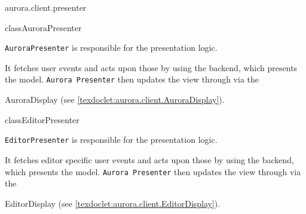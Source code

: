 \begin{texdocpackage}{aurora.client.presenter}
\label{texdoclet:aurora.client.presenter}

\begin{texdocclass}{class}{AuroraPresenter}{}{}
\label{texdoclet:aurora.client.presenter.AuroraPresenter}
\begin{texdocclassintro}
\begin{texdocp}
     \texttt{AuroraPresenter} is responsible for the presentation logic.
 \end{texdocp}\texdocbr  \begin{texdocp}
     It fetches user events and acts upon those by using the backend, which presents the model.
     \texttt{Aurora Presenter} then updates the view through via the \end{texdocp}AuroraDisplay (see \ref{texdoclet:aurora.client.AuroraDisplay}).
 \end{texdocclassintro}
\begin{texdocclassconstructors}
\end{texdocclassconstructors}
\end{texdocclass}


\begin{texdocclass}{class}{EditorPresenter}{}{}
\label{texdoclet:aurora.client.presenter.EditorPresenter}
\begin{texdocclassintro}
\begin{texdocp}
     \texttt{EditorPresenter} is responsible for the presentation logic.
 \end{texdocp}\texdocbr  \begin{texdocp}
     It fetches editor specific user events and acts upon those
     by using the backend, which presents the model. \texttt{Aurora Presenter} then updates the view through
     via the \end{texdocp}EditorDisplay (see \ref{texdoclet:aurora.client.EditorDisplay}).
 \end{texdocclassintro}
\begin{texdocclassconstructors}
\end{texdocclassconstructors}
\end{texdocclass}



\end{texdocpackage}
